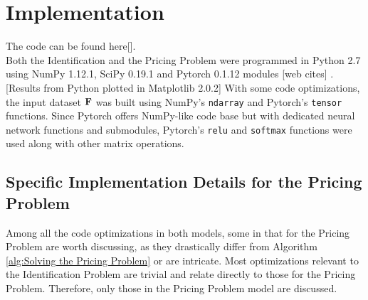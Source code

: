 \appendix
\chapter{Implementation} \label{app:Implementation}
The code can be found here[]. \\
Both the Identification and the Pricing Problem were programmed in Python 2.7 using NumPy 1.12.1, SciPy 0.19.1 and Pytorch 0.1.12 modules [web cites] \cite{SCPOptimizeDocs}\cite{NPDocs}. [Results from Python plotted in Matplotlib 2.0.2] With some code optimizations, the input dataset $\mathbf{F}$ was built using NumPy's \texttt{ndarray} and Pytorch's \texttt{tensor} functions. Since Pytorch offers NumPy-like code base but with dedicated neural network functions and submodules, Pytorch's \texttt{relu} and \texttt{softmax} functions were used along with other matrix operations.\\

\section{Specific Implementation Details for the Pricing Problem}
Among all the code optimizations in both models, some in that for the Pricing Problem are worth discussing, as they drastically differ from Algorithm \ref{alg:Solving the Pricing Problem} or are intricate. Most optimizations relevant to the Identification Problem are trivial and relate directly to those for the Pricing Problem. Therefore, only those in the Pricing Problem model are discussed.

